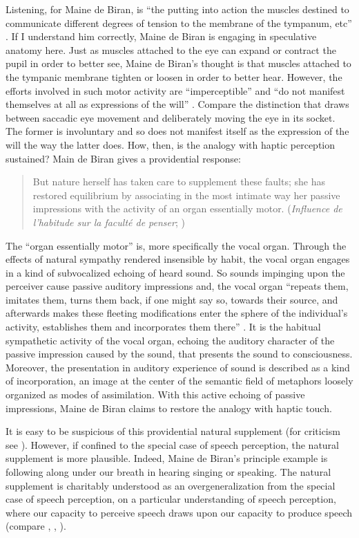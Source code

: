 Listening, for Maine de Biran, is ``the putting into action the muscles destined to communicate different degrees of tension to the membrane of the tympanum, etc'' \citep[64]{Boehm:1929aa}. If I understand him correctly, Maine de Biran is engaging in speculative anatomy here. Just as muscles attached to the eye can expand or contract the pupil in order to better see, Maine de Biran's thought is that muscles attached to the tympanic membrane tighten or loosen in order to better hear. However, the efforts involved in such motor activity are ``imperceptible'' and ``do not manifest themselves at all as expressions of the will'' \citep[64]{Boehm:1929aa}. Compare the distinction that \citet[]{Smith:2002sa} draws between saccadic eye movement and deliberately moving the eye in its socket. The former is involuntary and so does not manifest itself as the expression of the will the way the latter does. How, then, is the analogy with haptic perception sustained? Main de Biran gives a providential response:
\begin{quote}
	But nature herself has taken care to supplement these faults; she has restored equilibrium by associating in the most intimate way her passive impressions with the activity of an organ essentially motor. (\emph{Influence de l'habitude sur la faculté de penser}; \citealt[63--4]{Boehm:1929aa})
\end{quote}
The ``organ essentially motor'' is, more specifically the vocal organ. Through the effects of natural sympathy rendered insensible by habit, the vocal organ engages in a kind of subvocalized echoing of heard sound. So sounds impinging upon the perceiver cause passive auditory impressions and, the vocal organ ``repeats them, imitates them, turns them back, if one might say so, towards their source, and afterwards makes these fleeting modifications enter the sphere of the individual's activity, establishes them and incorporates them there'' \citep[64]{Boehm:1929aa}. It is the habitual sympathetic activity of the vocal organ, echoing the auditory character of the passive impression caused by the sound, that presents the sound to consciousness. Moreover, the presentation in auditory experience of sound is described as a kind of incorporation, an image at the center of the semantic field of metaphors loosely organized as modes of assimilation. With this active echoing of passive impressions, Maine de Biran claims to restore the analogy with haptic touch.

It is easy to be suspicious of this providential natural supplement (for criticism see \citealt[chapter 7]{Derrida:2005aa}). However, if confined to the special case of speech perception, the natural supplement is more plausible. Indeed, Maine de Biran's principle example is following along under our breath in hearing singing or speaking. The natural supplement is charitably understood as an overgeneralization from the special case of speech perception, on a particular understanding of speech perception, where our capacity to perceive speech draws upon our capacity to produce speech (compare \citealt[chapter 2]{Bergson:1912pi}, \citealt{Liberman:1985ty}, \citealt{Mole:2009hl}). 

